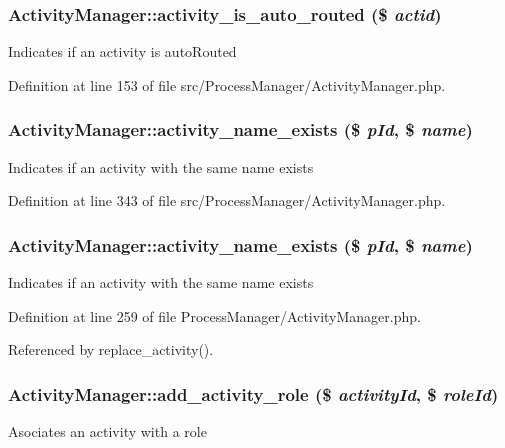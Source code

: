 \subsubsection{\setlength{\rightskip}{0pt plus 5cm}Activity\-Manager::activity\_\-is\_\-auto\_\-routed (\$ {\em actid})}\label{classActivityManager_a26}


Indicates if an activity is auto\-Routed 

Definition at line 153 of file src/Process\-Manager/Activity\-Manager.php.
\subsubsection{\setlength{\rightskip}{0pt plus 5cm}Activity\-Manager::activity\_\-name\_\-exists (\$ {\em p\-Id}, \$ {\em name})}\label{classActivityManager_a30}


Indicates if an activity with the same name exists 

Definition at line 343 of file src/Process\-Manager/Activity\-Manager.php.
\subsubsection{\setlength{\rightskip}{0pt plus 5cm}Activity\-Manager::activity\_\-name\_\-exists (\$ {\em p\-Id}, \$ {\em name})}\label{classActivityManager_a11}


Indicates if an activity with the same name exists 

Definition at line 259 of file Process\-Manager/Activity\-Manager.php.

Referenced by replace\_\-activity().
\subsubsection{\setlength{\rightskip}{0pt plus 5cm}Activity\-Manager::add\_\-activity\_\-role (\$ {\em activity\-Id}, \$ {\em role\-Id})}\label{classActivityManager_a18}


Asociates an activity with a role 

